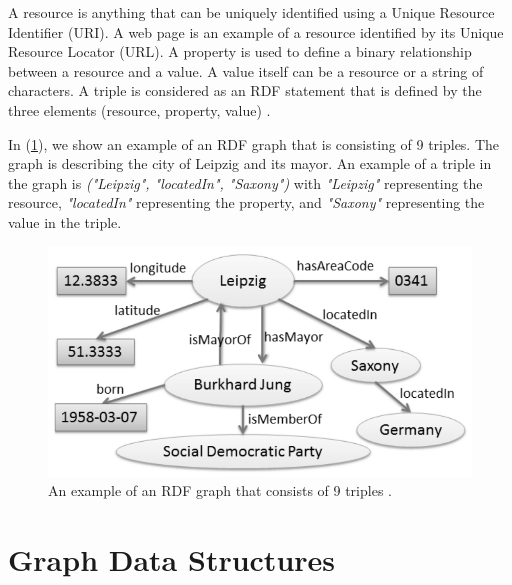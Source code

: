 {A resource is anything that can be uniquely identified using a Unique Resource Identifier (URI). A web page is an example of a resource identified by its Unique Resource Locator (URL). A property is used to define a binary relationship between a resource and a value. A value itself can be a resource or a string of characters. A triple is considered as an RDF statement that is defined by the three elements (resource, property, value) \cite{Las99,Lee2005}.



In (\ref{fig:RDF}), we show an example of an RDF graph that is consisting of 9 triples. The graph is describing the city of Leipzig and its mayor. An example of a triple in the graph is \textit{("Leipzig", "locatedIn", "Saxony")} with \textit{"Leipzig"} representing the resource, \textit{"locatedIn"} representing the property, and \textit{"Saxony"} representing the value in the triple.


\begin{figure}[H]
\centering
\includegraphics[width=15cm]{pics/RDF-Graph.png}
\caption{An example of an RDF graph that consists of 9 triples \cite{ngomo2014introduction}.}
\label{fig:RDF}
\end{figure} 

\section{Graph Data Structures}
\label{sec:StorageStructures}

}
